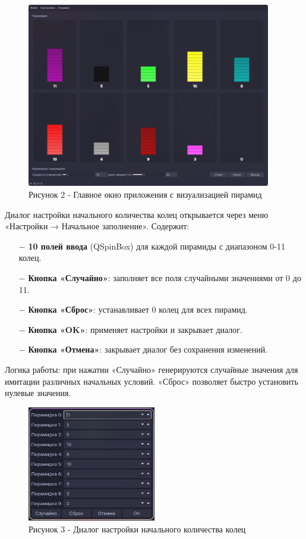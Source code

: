\documentclass[oneside,a4paper,14pt]{extarticle}
\begin{document}
\begin{figure}[H]
  \centering
  \includegraphics[width=0.95\textwidth]{pics/main_window.png}
  \caption*{Рисунок 2 - Главное окно приложения с визуализацией пирамид}
\end{figure}

Диалог настройки начального количества колец открывается через меню «Настройки → Начальное заполнение». Содержит:

\begin{itemize}
  \item[$-$] \textbf{10 полей ввода} (QSpinBox) для каждой пирамиды с диапазоном 0-11 колец.
  \item[$-$] \textbf{Кнопка «Случайно»}: заполняет все поля случайными значениями от 0 до 11.
  \item[$-$] \textbf{Кнопка «Сброс»}: устанавливает 0 колец для всех пирамид.
  \item[$-$] \textbf{Кнопка «OK»}: применяет настройки и закрывает диалог.
  \item[$-$] \textbf{Кнопка «Отмена»}: закрывает диалог без сохранения изменений.
\end{itemize}

Логика работы: при нажатии «Случайно» генерируются случайные значения для имитации различных начальных условий. «Сброс» позволяет быстро установить нулевые значения.

\begin{figure}[H]
  \centering
  \includegraphics[width=0.5\textwidth]{pics/initial_fill_dialog.png}
  \caption*{Рисунок 3 - Диалог настройки начального количества колец}
\end{figure}
\end{document}
